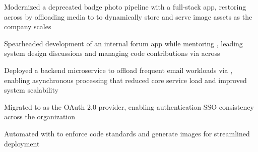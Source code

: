 
\begin{bullets}
		\item Modernized a deprecated badge photo pipeline with a full-stack  app, restoring  across  by offloading media to  to dynamically store and serve image assets as the company scales

		\item Spearheaded development of an internal forum app while mentoring , leading system design discussions and managing code contributions via  across 

		\item Deployed a  backend microservice to offload frequent email workloads via , enabling asynchronous processing that reduced core service load and improved system scalability

		\item Migrated  to  as the OAuth 2.0 provider, enabling authentication SSO consistency across the organization


		\item Automated  with  to enforce code standards and generate  images for streamlined deployment
		

\end{bullets}

